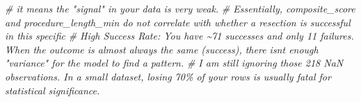 \documentclass[
]{article}
\newenvironment{Shaded}{\begin{snugshade}}{\end{snugshade}}
\newcommand{\CommentTok}[1]{\textcolor[rgb]{0.56,0.35,0.01}{\textit{#1}}}
\begin{document}
\begin{Shaded}
\begin{Highlighting}[]
\CommentTok{\# it means the "signal" in your data is very weak.}
\CommentTok{\# Essentially, composite\_score and procedure\_length\_min do not correlate with whether a resection is successful in this specific }
\CommentTok{\# High Success Rate: You have \textasciitilde{}71 successes and only 11 failures. When the outcome is almost always the same (success), there isn\textquotesingle{}t enough "variance" for the model to find a pattern.}
\CommentTok{\# I am still ignoring those 218 NaN observations. In a small dataset, losing 70\% of your rows is usually fatal for statistical significance.}
\end{Highlighting}
\end{Shaded}
\end{document}
